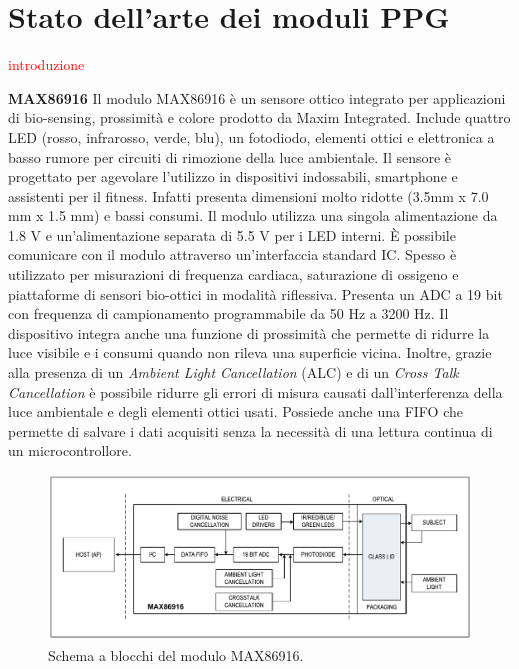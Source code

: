 \section{Stato dell'arte dei moduli PPG}
\textcolor{red}{introduzione}

\textbf{MAX86916} Il modulo MAX86916 è un sensore ottico integrato per applicazioni di bio-sensing, prossimità e colore prodotto da Maxim Integrated\cite{IntegratedMAX86916}. Include quattro LED (rosso, infrarosso, verde, blu), un fotodiodo, elementi ottici e elettronica a basso rumore per circuiti di rimozione della luce ambientale. Il sensore è progettato per agevolare l'utilizzo in dispositivi indossabili, smartphone e assistenti per il fitness. Infatti presenta dimensioni molto ridotte (3.5mm x 7.0 mm x 1.5 mm) e bassi consumi. Il modulo utilizza una singola alimentazione da 1.8 V e un'alimentazione separata di 5.5 V per i LED interni. \`E possibile comunicare con il modulo attraverso un'interfaccia standard IC. Spesso è utilizzato per misurazioni di frequenza cardiaca, saturazione di ossigeno e piattaforme di sensori bio-ottici in modalità riflessiva. Presenta un ADC a 19 bit con frequenza di campionamento programmabile da 50 Hz a 3200 Hz. Il dispositivo integra anche una funzione di prossimità che permette di ridurre la luce visibile e i consumi quando non rileva una superficie vicina. Inoltre, grazie alla presenza di un \textit{Ambient Light Cancellation} (ALC) e di un \textit{Cross Talk Cancellation} è possibile ridurre gli errori di misura causati dall'interferenza della luce ambientale e degli elementi ottici usati. Possiede anche una FIFO che permette di salvare i dati acquisiti senza la necessità di una lettura continua di un microcontrollore.
\begin{figure}[h]
	\centering
	\includegraphics[width=1\linewidth]{ImageFiles/Fotopletismografia/MAX86916BlockDiagram}
	\caption{Schema a blocchi del modulo MAX86916.}
	\label{fig:MAX86916BlockDiagram}
\end{figure}

